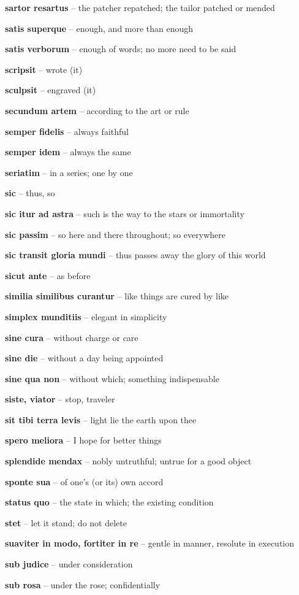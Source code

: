 \documentclass[12pt]{article}
\newcommand{\lat}[1]{\textbf{#1}}
\begin{document}
\lat{sartor resartus} -- the patcher repatched; the tailor patched or mended

\lat{satis superque} -- enough, and more than enough

\lat{satis verborum} -- enough of words; no more need to be said

\lat{scripsit} -- wrote (it)

\lat{sculpsit} -- engraved (it)

\lat{secundum artem} -- according to the art or rule

\lat{semper fidelis} -- always faithful

\lat{semper idem} -- always the same

\lat{seriatim} -- in a series; one by one

\lat{sic} -- thus, so

\lat{sic itur ad astra} -- such is the way to the stars or immortality

\lat{sic passim} -- so here and there throughout; so everywhere

\lat{sic transit gloria mundi} -- thus passes away the glory of this world

\lat{sicut ante} -- as before

\lat{similia similibus curantur} -- like things are cured by like

\lat{simplex munditiis} -- elegant in simplicity

\lat{sine cura} -- without charge or care

\lat{sine die} -- without a day being appointed

\lat{sine qua non} -- without which; something indispensable

\lat{siste, viator} -- stop, traveler

\lat{sit tibi terra levis} -- light lie the earth upon thee

\lat{spero meliora} -- I hope for better things

\lat{splendide mendax} -- nobly untruthful; untrue for a good object

\lat{sponte sua} -- of one's (or its) own accord

\lat{status quo} -- the state in which; the existing condition

\lat{stet} -- let it stand; do not delete

\lat{suaviter in modo, fortiter in re} -- gentle in manner, resolute in execution

\lat{sub judice} -- under consideration

\lat{sub rosa} -- under the rose; confidentially
\end{document}
